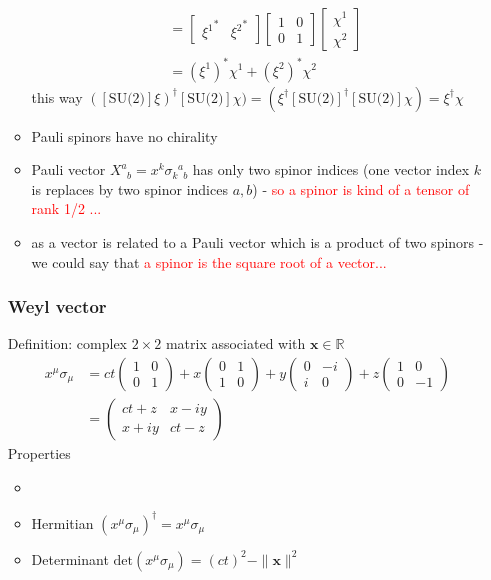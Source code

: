 \documentclass[../main.tex]{subfiles}
\begin{document}
\begin{itemize}
\begin{itemize}
\begin{align}
&=\left[\begin{matrix}{\xi^1}^*&{\xi^2}^*\end{matrix}\right]
\left[\begin{matrix}1&0\\0&1\end{matrix}\right]
\left[\begin{matrix}\chi^1\\\chi^2\end{matrix}\right]\\
&=(\xi^1)^*\chi^1+(\xi^2)^*\chi^2
\end{align}
this way $([\text{SU(2)}]\xi)^\dagger[\text{SU(2)}]\chi)=(\xi^\dagger[\text{SU(2)}]^\dagger[\text{SU(2)}]\chi)=\xi^\dagger\chi$
\item Pauli spinors have no chirality
\item Pauli vector $X^a_{\;\;b}=x^k\sigma_{k\;\;b}^{\;\;a}$ has only two spinor indices (one vector index $k$ is replaces by two spinor indices $a, b$) - \textcolor{red}{so a spinor is kind of a tensor of rank 1/2 ...}
\item as a vector is related to a Pauli vector which is a product of two spinors - we could say that \textcolor{red}{a spinor is the square root of a vector...} 
\end{itemize}

\subsubsection{Weyl vector}
Definition: complex $2\times2$ matrix associated with $\mathbf{x}\in \mathbb{R}$
\begin{align}
x^\mu\sigma_\mu
&=
 ct\left(\begin{matrix}
1 & 0\\
0 & 1\end{matrix}\right)
+x\left(\begin{matrix}
0 & 1\\
1 & 0
\end{matrix}\right)
+y\left(\begin{matrix}
0 & -i\\
i & 0
\end{matrix}\right)
+z\left(\begin{matrix}
1 & 0\\
0 & -1
\end{matrix}\right)\\
&=\left(\begin{matrix}
ct+z & x-iy\\
x+iy & ct-z
\end{matrix}\right)
\end{align}
Properties
\begin{itemize}
\item 
\item Hermitian $(x^\mu\sigma_\mu)^\dagger=x^\mu\sigma_\mu$
\item Determinant $\text{det}(x^\mu\sigma_\mu)=(ct)^2-\|\mathbf{x}\|^2$


\end{itemize}
\end{itemize}
\end{document}
